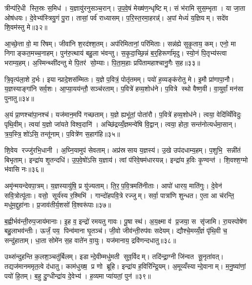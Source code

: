 त्रीन्प॑रि॒धी स्ति॒स्रः स॒मिध॑। य॒ज्ञायु॑रनुसञ्च॒रान्। उ॒प॒वे॒षं मेख्ष॑ण॒न्धृष्टिम्। सं भ॑रामि सुस॒म्भृता। या जा॒ता ओष॑धयः। दे॒वेभ्य॑स्त्रियु॒गं पु॒रा। तासां॒ पर्व॑ राध्यासम्। प॒रि॒स्त॒रमा॒हरन्न्॑॑। अ॒पां मेध्यं॑ य॒ज्ञियम्। सदे॑व शि॒वम॑स्तु मे॥३२॥

आ॒च्छे॒त्ता वो॒ मा रि॑षम्। जीवा॑नि श॒रद॑श्श॒तम्। अप॑रिमितानां॒ परि॑मिताः। सन्न॑ह्ये सुकृ॒ताय॒ कम्। एनो॒ मा निगाङ्कत॒मच्च॒नाहम्। पुन॑रु॒त्थाय॑ बहु॒ला भ॑वन्तु। स॒कृ॒दा॒च्छि॒न्नं ब॒र्॒हिरूर्णा॑मृदु। स्यो॒नं पि॒तृभ्य॑स्त्वा भराम्य॒हम्। अ॒स्मिन्थ्सी॑दन्तु मे पि॒तर॑ सो॒म्याः। पि॒ता॒म॒हाः प्रपि॑तामहाश्चानु॒गैः स॒ह॥३३॥

त्रि॒वृत्प॑ला॒शे द॒र्भः। इयान्प्रादे॒शस॑म्मितः। य॒ज्ञे प॒वित्रं॒ पोतृ॑तमम्। पयो॑ ह॒व्यङ्क॑रोतु मे। इ॒मौ प्रा॑णापा॒नौ। य॒ज्ञस्याङ्गा॑नि सर्व॒शः। आ॒प्या॒यय॑न्तौ॒ सञ्च॑रताम्। प॒वित्रे॑ हव्य॒शोध॑ने। प॒वित्रे स्थो वैष्ण॒वी। वा॒युर्वां॒ मन॑सा पुनातु॥३४॥

अ॒यं प्रा॒णश्चा॑पा॒नश्च॑। यज॑मान॒मपि॑ गच्छताम्। य॒ज्ञे ह्यभू॑तां॒ पोता॑रौ। प॒वित्रे॑ हव्य॒शोध॑ने। त्वया॒ वेदि॑व्विँविदुः पृथि॒वीम्। त्वया॑ य॒ज्ञो जा॑यते विश्व॒दानि॑। अच्छि॑द्रय्यँ॒ज्ञमन्वे॑षि वि॒द्वान्। त्वया॒ होता॒ सन्त॑नोत्यर्धमा॒सान्। त्र॒य॒स्त्रि॒शो॑ऽसि॒ तन्तू॑नाम्। प॒वित्रे॑ण स॒हाग॑हि॥३५॥

शि॒वेय रज्जु॑रभि॒धानी। अ॒घ्नि॒यामुप॑ सेवताम्। अप्र॑स्रसाय य॒ज्ञस्य॑। उ॒खे उप॑दधाम्य॒हम्। प॒शुभि॒ सन्नी॑तं बिभृताम्। इन्द्रा॑य शृ॒तन्दधि॑। उ॒प॒वे॒षो॑ऽसि य॒ज्ञाय॑। त्वां प॑रिवे॒षम॑धारयन्न्। इन्द्रा॑य ह॒विः कृ॒ण्वन्त॑। शि॒वश्श॒ग्मो भ॑वासि नः॥३६॥

अमृ॑न्मयन्देवपा॒त्रम्। य॒ज्ञस्यायु॑षि॒ प्र यु॑ज्यताम्। ति॒र॒प॒वि॒त्रमति॑नीताः। आपो॑ धारय॒ माति॑गुः। दे॒वेन॑ सवि॒त्रोत्पू॑ताः। वसो॒ सूर्य॑स्य र॒श्मिभि॑। गान्दो॑हपवि॒त्रे रज्जुम्। सर्वा॒ पात्रा॑णि शुन्धत। ए॒ता आ च॑रन्ति॒ मधु॑म॒द्दुहा॑नाः। प्र॒जाव॑तीर्य॒शसो॑ वि॒श्वरू॑पाः॥३७॥

ब॒ह्वीर्भव॑न्ती॒रुप॒जाय॑मानाः। इ॒ह व॒ इन्द्रो॑ रमयतु गावः। पू॒षा स्थ॑। अ॒य॒क्ष्मा व॑ प्र॒जया॒ स सृ॑जामि। रा॒यस्पोषे॑ण बहु॒लाभव॑न्तीः। ऊर्जं॒ पय॒ पिन्व॑माना घृ॒तञ्च॑। जी॒वो जीव॑न्ती॒रुप॑वः सदेयम्। द्यौश्चे॒मय्यँ॒ज्ञं पृ॑थि॒वी च॒ सन्दु॑हाताम्। धा॒ता सोमे॑न स॒ह वाते॑न वा॒युः। यज॑मानाय॒ द्रवि॑णन्दधातु॥३८॥

उथ्स॑न्दुहन्ति क॒लश॒ञ्चतु॑र्बिलम्। इडान्दे॒वीम्मधु॑मती सुव॒र्विदम्। तदि॑न्द्रा॒ग्नी जि॑न्वत सू॒नृता॑वत्। तद्यज॑मानममृत॒त्वे द॑धातु। काम॑धुख्ष॒ प्र णो ब्रूहि। इन्द्रा॑य ह॒विरि॑न्द्रि॒यम्। अ॒मूय्यँस्यान्दे॒वानाम्। म॒नु॒ष्या॑णां॒ पयो॑ हि॒तम्। ब॒हु दु॒ग्धीन्द्रा॑य दे॒वेभ्य॑। ह॒व्यमा प्या॑यतां॒ पुन॑॥३९॥

